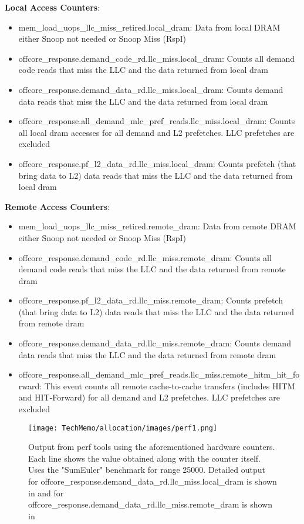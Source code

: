 \documentclass[a4paper,11pt]{article}
\begin{document}
\begin{description}
\item \textbf{Local Access Counters}:
\begin{itemize}
    \item mem\_load\_uops\_llc\_miss\_retired.local\_dram: Data from local DRAM either Snoop not needed or Snoop Miss (RspI)
    \item offcore\_response.demand\_code\_rd.llc\_miss.local\_dram: Counts all demand code reads that miss the LLC and the data returned from local dram
    \item offcore\_response.demand\_data\_rd.llc\_miss.local\_dram: Counts demand data reads that miss the LLC and the data returned from local dram
    \item offcore\_response.all\_demand\_mlc\_pref\_reads.llc\_miss.local\_dram: Counts all local dram accesses for all demand and L2 prefetches. LLC prefetches are excluded
    \item offcore\_response.pf\_l2\_data\_rd.llc\_miss.local\_dram: Counts prefetch (that bring data to L2) data reads that miss the LLC and the data returned from local dram
\end{itemize}
\item \textbf{Remote Access Counters}: 
\begin{itemize}
    \item mem\_load\_uops\_llc\_miss\_retired.remote\_dram: Data from remote DRAM either Snoop not needed or Snoop Miss (RspI)
    \item offcore\_response.demand\_code\_rd.llc\_miss.remote\_dram: Counts all demand code reads that miss the LLC and the data returned from remote dram
    \item offcore\_response.pf\_l2\_data\_rd.llc\_miss.remote\_dram: Counts prefetch (that bring data to L2) data reads that miss the LLC and the data returned from remote dram
    \item offcore\_response.demand\_data\_rd.llc\_miss.remote\_dram: Counts demand data reads that miss the LLC and the data returned from remote dram
    \item offcore\_response.all\_demand\_mlc\_pref\_reads.llc\_miss.remote\_hitm\_hit\_forward: This event counts all remote cache-to-cache transfers (includes HITM and HIT-Forward) for all demand and L2 prefetches. LLC prefetches are excluded
\end{itemize}
\end{description}


\begin{figure}[!htb]
    \centering
    \texttt{[image: TechMemo/allocation/images/perf1.png]}
    \caption{Output from perf tools using the aforementioned hardware counters. Each line shows the value obtained along with the counter itself. Uses the "SumEuler" benchmark for range 25000. Detailed output for offcore\_response.demand\_data\_rd.llc\_miss.local\_dram is shown in  and for offcore\_response.demand\_data\_rd.llc\_miss.remote\_dram is shown in }
    \label{fig:perf_counters}
\end{figure}
\end{document}
